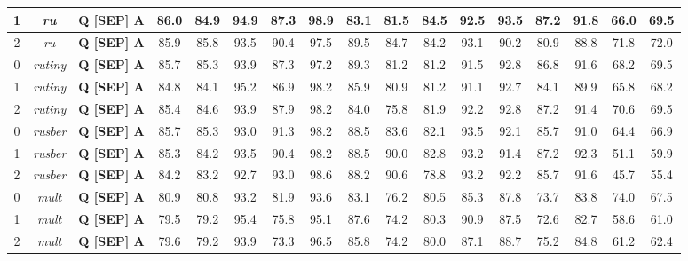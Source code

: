 \begin{table}[]
{\begin{tabular}{|c|c||c|c|c|c|c|c|c|c|c|c|c|c|c|c|c|}
1 & \textit{ru} &  \textbf{Q [SEP] A} & 86.0 & 84.9 & 94.9 & 87.3 & 98.9 & 83.1 & 81.5 & 84.5 & 92.5 & 93.5 & 87.2 & 91.8 & 66.0 & 69.5\\ \hline
2 & \textit{ru} &  \textbf{Q [SEP] A} & 85.9 & 85.8 & 93.5 & 90.4 & 97.5 & 89.5 & 84.7 & 84.2 & 93.1 & 90.2 & 80.9 & 88.8 & 71.8 & 72.0\\ \hline
0 & \textit{rutiny} &  \textbf{Q [SEP] A} & 85.7 & 85.3 & 93.9 & 87.3 & 97.2 & 89.3 & 81.2 & 81.2 & 91.5 & 92.8 & 86.8 & 91.6 & 68.2 & 69.5\\ \hline
1 & \textit{rutiny} &  \textbf{Q [SEP] A} & 84.8 & 84.1 & 95.2 & 86.9 & 98.2 & 85.9 & 80.9 & 81.2 & 91.1 & 92.7 & 84.1 & 89.9 & 65.8 & 68.2\\ \hline
2 & \textit{rutiny} &  \textbf{Q [SEP] A} & 85.4 & 84.6 & 93.9 & 87.9 & 98.2 & 84.0 & 75.8 & 81.9 & 92.2 & 92.8 & 87.2 & 91.4 & 70.6 & 69.5\\ \hline
0 & \textit{rusber} &  \textbf{Q [SEP] A} & 85.7 & 85.3 & 93.0 & 91.3 & 98.2 & 88.5 & 83.6 & 82.1 & 93.5 & 92.1 & 85.7 & 91.0 & 64.4 & 66.9\\ \hline
1 & \textit{rusber} &  \textbf{Q [SEP] A} & 85.3 & 84.2 & 93.5 & 90.4 & 98.2 & 88.5 & 90.0 & 82.8 & 93.2 & 91.4 & 87.2 & 92.3 & 51.1 & 59.9\\ \hline
2 & \textit{rusber} &  \textbf{Q [SEP] A} & 84.2 & 83.2 & 92.7 & 93.0 & 98.6 & 88.2 & 90.6 & 78.8 & 93.2 & 92.2 & 85.7 & 91.6 & 45.7 & 55.4\\ \hline
0 & \textit{mult} &  \textbf{Q [SEP] A} & 80.9 & 80.8 & 93.2 & 81.9 & 93.6 & 83.1 & 76.2 & 80.5 & 85.3 & 87.8 & 73.7 & 83.8 & 74.0 & 67.5\\ \hline
1 & \textit{mult} &  \textbf{Q [SEP] A} & 79.5 & 79.2 & 95.4 & 75.8 & 95.1 & 87.6 & 74.2 & 80.3 & 90.9 & 87.5 & 72.6 & 82.7 & 58.6 & 61.0\\ \hline
2 & \textit{mult} &  \textbf{Q [SEP] A} & 79.6 & 79.2 & 93.9 & 73.3 & 96.5 & 85.8 & 74.2 & 80.0 & 87.1 & 88.7 & 75.2 & 84.8 & 61.2 & 62.4\\ \hline
\end{tabular}}
\end{table}

